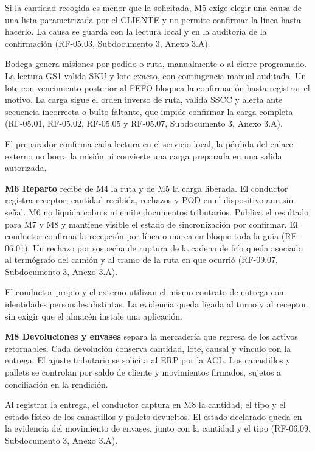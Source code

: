 Si la cantidad recogida es menor que la solicitada, M5 exige elegir una causa de una lista parametrizada por el CLIENTE y no permite confirmar la línea hasta hacerlo. La causa se guarda con la lectura local y en la auditoría de la confirmación (RF-05.03, Subdocumento 3, Anexo 3.A).

Bodega genera misiones por pedido o ruta, manualmente o al cierre programado. La lectura GS1 valida SKU y lote exacto, con contingencia manual auditada. Un lote con vencimiento posterior al FEFO bloquea la confirmación hasta registrar el motivo. La carga sigue el orden inverso de ruta, valida SSCC y alerta ante secuencia incorrecta o bulto faltante, que impide confirmar la carga completa (RF-05.01, RF-05.02, RF-05.05 y RF-05.07, Subdocumento 3, Anexo 3.A).

El preparador confirma cada lectura en el servicio local, la pérdida del enlace externo no borra la misión ni convierte una carga preparada en una salida autorizada.

\textbf{M6 Reparto} recibe de M4 la ruta y de M5 la carga liberada. El conductor registra receptor, cantidad recibida, rechazos y POD en el dispositivo aun sin señal. M6 no liquida cobros ni emite documentos tributarios. Publica el resultado para M7 y M8 y mantiene visible el estado de sincronización por confirmar. El conductor confirma la recepción por línea o marca en bloque toda la guía (RF-06.01). Un rechazo por sospecha de ruptura de la cadena de frío queda asociado al termógrafo del camión y al tramo de la ruta en que ocurrió (RF-09.07, Subdocumento 3, Anexo 3.A).

El conductor propio y el externo utilizan el mismo contrato de entrega con identidades personales distintas. La evidencia queda ligada al turno y al receptor, sin exigir que el almacén instale una aplicación.

\textbf{M8 Devoluciones y envases} separa la mercadería que regresa de los activos retornables. Cada devolución conserva cantidad, lote, causal y vínculo con la entrega. El ajuste tributario se solicita al ERP por la ACL. Los canastillos y pallets se controlan por saldo de cliente y movimientos firmados, sujetos a conciliación en la rendición.

Al registrar la entrega, el conductor captura en M8 la cantidad, el tipo y el estado físico de los canastillos y pallets devueltos. El estado declarado queda en la evidencia del movimiento de envases, junto con la cantidad y el tipo (RF-06.09, Subdocumento 3, Anexo 3.A).

